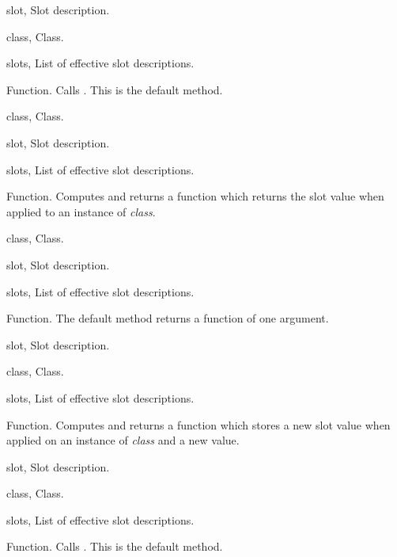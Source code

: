 \begin{optDefinition}
%
\begin{specargs}
    \item[slot, \classref{slot}] Slot description.
    \item[class, \classref{class}] Class.
    \item[slots, \classref{list}] List of effective slot
    descriptions.
\end{specargs}
%
\result%
Function.
%
\remarks%
Calls .  This is the default
method.

%
\begin{genericargs}
    \item[class, \classref{class}] Class.
    \item[slot, \classref{slot}] Slot description.
    \item[slots, \classref{list}] List of effective slot
    descriptions.
\end{genericargs}
%
\result%
Function.
%
\remarks%
Computes and returns a function which returns the slot value when
applied to an instance of {\em class}.

%
\begin{specargs}
    \item[class, \classref{class}] Class.
    \item[slot, \classref{slot}] Slot description.
    \item[slots, \classref{list}] List of effective slot
    descriptions.
\end{specargs}
%
\result%
Function.
%
\remarks%
The default method returns a function of one argument.

%
\begin{genericargs}
    \item[slot, \classref{slot}] Slot description.
    \item[class, \classref{class}] Class.
    \item[slots, \classref{list}] List of effective slot
    descriptions.
\end{genericargs}
%
\result%
Function.
%
\remarks%
Computes and returns a function which stores a new slot value when
applied on an instance of {\em class} and a new value.

%
\begin{specargs}
    \item[slot, \classref{slot}] Slot description.
    \item[class, \classref{class}] Class.
    \item[slots, \classref{list}] List of effective slot
    descriptions.
\end{specargs}
%
\result%
Function.
%
\remarks%
Calls .  This is the default
method.


\end{optDefinition}
